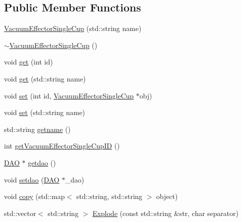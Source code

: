 \subsection*{Public Member Functions}
\begin{DoxyCompactItemize}
\item 
\hyperlink{class_vacuum_effector_single_cup_a8c278236dcca8c55defc75d7bfc27670}{VacuumEffectorSingleCup} (std::string name)
\item 
\hyperlink{class_vacuum_effector_single_cup_ae3145079db408e3190f0da8cd32ca172}{$\sim$VacuumEffectorSingleCup} ()
\item 
void \hyperlink{class_vacuum_effector_single_cup_a9f70755bcbc4befc7ec7d4bf4bed77d2}{get} (int id)
\item 
void \hyperlink{class_vacuum_effector_single_cup_a5ae1745edb7c88858b86df5d3f74297c}{get} (std::string name)
\item 
void \hyperlink{class_vacuum_effector_single_cup_a5bf89428c9a002b243377ed090b5cd79}{set} (int id, \hyperlink{class_vacuum_effector_single_cup}{VacuumEffectorSingleCup} $\ast$obj)
\item 
void \hyperlink{class_vacuum_effector_single_cup_a2dcebecbd0005cc0a5fb8ec70bea4220}{set} (std::string name)
\item 
std::string \hyperlink{class_vacuum_effector_single_cup_ac6a49057ddb41b039d0c0be1365e6e9e}{getname} ()
\item 
int \hyperlink{class_vacuum_effector_single_cup_a9bd480c4446099c6bd256ca804c4de67}{getVacuumEffectorSingleCupID} ()
\item 
\hyperlink{class_d_a_o}{DAO} $\ast$ \hyperlink{class_vacuum_effector_single_cup_ab0b1538f9de12e37b521ce1161257730}{getdao} ()
\item 
void \hyperlink{class_vacuum_effector_single_cup_a009ae56509931d2bd5bb8a00b3b79983}{setdao} (\hyperlink{class_d_a_o}{DAO} $\ast$\_\-dao)
\item 
void \hyperlink{class_vacuum_effector_single_cup_a3a4386ea65ec07e7279301c6a26579a3}{copy} (std::map$<$ std::string, std::string $>$ object)
\item 
std::vector$<$ std::string $>$ \hyperlink{class_vacuum_effector_single_cup_aca38516cf8a90a4ad1bad726f2d82386}{Explode} (const std::string \&str, char separator)
\end{DoxyCompactItemize}


